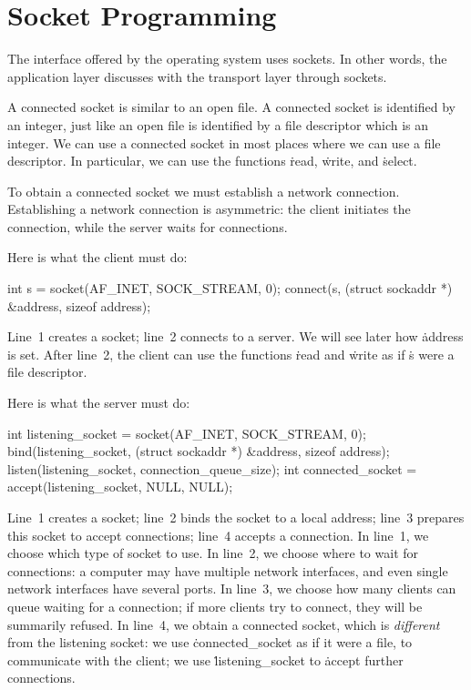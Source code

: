 \section{Socket Programming}

The interface offered by the operating system uses sockets.
In other words,
  the application layer discusses with the transport layer through sockets.

A connected socket is similar to an open file.
A connected socket is identified by an integer,
  just like an open file is identified by a file descriptor which is an integer.
We can use a connected socket in most places where we can use a file descriptor.
In particular, we can use the functions \.{read}, \.{write}, and \.{select}.

To obtain a connected socket we must establish a network connection.
Establishing a network connection is asymmetric:
  the client initiates the connection,
  while the server waits for connections.

Here is what the client must do:
\begin{ccode}
int s = socket(AF_INET, SOCK_STREAM, 0);
connect(s, (struct sockaddr *) &address, sizeof address);
\end{ccode}
Line~1 creates a socket; line~2 connects to a server.
We will see later how \.{address} is set.
After line~2, the client can use the functions \.{read} and \.{write}
  as if \.{s} were a file descriptor.

Here is what the server must do:
\begin{ccode}
int listening_socket = socket(AF_INET, SOCK_STREAM, 0);
bind(listening_socket, (struct sockaddr *) &address, sizeof address);
listen(listening_socket, connection_queue_size);
int connected_socket = accept(listening_socket, NULL, NULL);
\end{ccode}
Line~1 creates a socket;
  line~2 binds the socket to a local address;
  line~3 prepares this socket to accept connections;
  line~4 accepts a connection.
In line~1, we choose which type of socket to use.
In line~2, we choose where to wait for connections:
  a computer may have multiple network interfaces,
  and even single network interfaces have several ports.
In line~3, we choose how many clients can queue waiting for a connection;
  if more clients try to connect, they will be summarily refused.
In line~4, we obtain a connected socket,
  which is \emph{different} from the listening socket:
  we use \.{connected\_socket} as if it were a file, to communicate with the client;
  we use \.{listening\_socket} to \.{accept} further connections.

